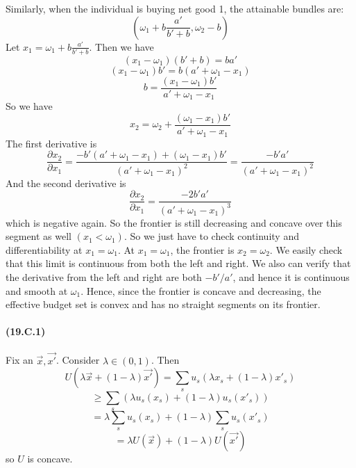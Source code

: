 \documentclass[10pt,letter]{article}
\begin{document}
Similarly, when the individual is buying net good 1, the attainable bundles are:
\[ \left(\omega_1 + b\frac{a'}{b' + b}, \omega_2 - b \right) \]
Let $x_1 = \omega_1 + b\frac{a'}{b' + b}$. Then we have
\[ (x_1 - \omega_1)(b' + b) = b a' \]
\[ (x_1 - \omega_1)b'  = b(a' + \omega_1 - x_1) \]
\[ b = \frac{(x_1 - \omega_1)b'}{a' + \omega_1 - x_1} \]
So we have
\[ x_2 = \omega_2 + \frac{(\omega_1 - x_1)b'}{a' + \omega_1 - x_1} \]
The first derivative is
\[ \frac{\partial x_2 }{\partial x_1} = \frac{- b'(a' + \omega_1 - x_1) + (\omega_1 - x_1)b'}{(a'  + \omega_1 - x_1)^2} = \frac{- b'a'}{(a' + \omega_1 - x_1)^2} \]
And the second derivative is
\[ \frac{\partial x_2 }{\partial x_1}  = \frac{- 2b'a'}{(a' + \omega_1 - x_1)^3} \]
which is negative again. So the frontier is still decreasing and concave over this segment as well $(x_1 < \omega_1)$. So we just have to check continuity and differentiability at $x_1 = \omega_1$. At $x_1 = \omega_1$, the frontier is $x_2 = \omega_2$. We easily check that this limit is continuous from both the left and right. We also can verify that the derivative from the left and right are both $-b'/a'$, and hence it is continuous and smooth at $\omega_1$. Hence, since the frontier is concave and decreasing, the effective budget set is convex and has no straight segments on its frontier.


\paragraph{(19.C.1)}
Fix an $\vec{x}, \vec{x'}$. Consider $\lambda \in (0,1)$. Then
\[ U(\lambda \vec{x} + (1-\lambda) \vec{x'}) = \sum_s u_s(\lambda x_s + (1-\lambda) x'_s) \]
\[ \ge \sum_s (\lambda u_s(x_s) + (1-\lambda) u_s(x'_s)) \]
\[ = \lambda \sum_s  u_s(x_s) + (1-\lambda) \sum_s  u_s(x'_s) \]
\[ = \lambda U(\vec{x}) + (1-\lambda) U(\vec{x'}) \]
so $U$ is concave.
\end{document}
